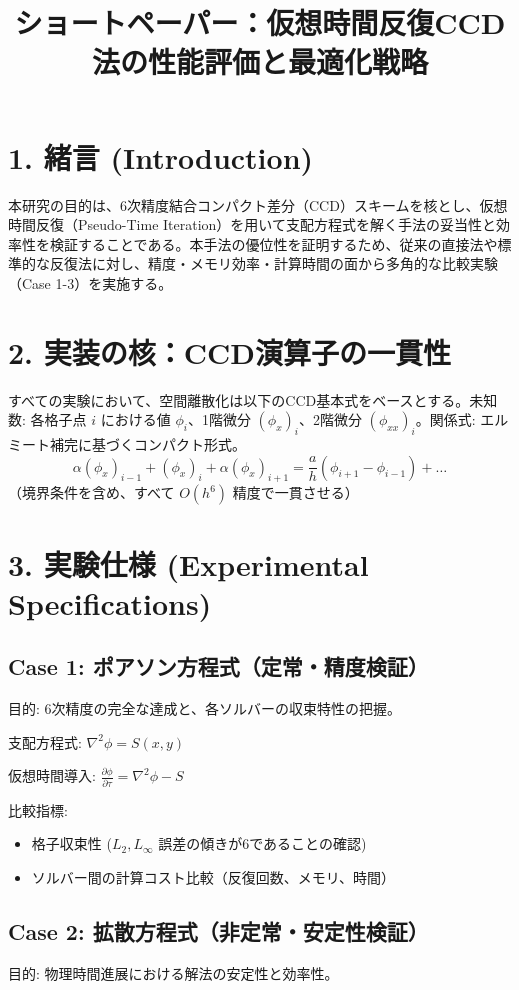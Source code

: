 \documentclass[12pt, a4paper, titlepage]{article}
\title{ショートペーパー：仮想時間反復CCD法の性能評価と最適化戦略}
\author{}
\date{}
\begin{document}
\maketitle

\section*{1. 緒言 (Introduction)}
本研究の目的は、6次精度結合コンパクト差分（CCD）スキームを核とし、仮想時間反復（Pseudo-Time Iteration）を用いて支配方程式を解く手法の妥当性と効率性を検証することである。本手法の優位性を証明するため、従来の直接法や標準的な反復法に対し、精度・メモリ効率・計算時間の面から多角的な比較実験（Case 1-3）を実施する。

\section*{2. 実装の核：CCD演算子の一貫性}
すべての実験において、空間離散化は以下のCCD基本式をベースとする。未知数: 各格子点 $i$ における値 $\phi_i$、1階微分 $(\phi_x)_i$、2階微分 $(\phi_{xx})_i$。関係式: エルミート補完に基づくコンパクト形式。
$$\alpha (\phi_x)_{i-1} + (\phi_x)_i + \alpha (\phi_x)_{i+1} = \frac{a}{h}(\phi_{i+1} - \phi_{i-1}) + \dots$$
（境界条件を含め、すべて $O(h^6)$ 精度で一貫させる）

\section*{3. 実験仕様 (Experimental Specifications)}

\subsection*{Case 1: ポアソン方程式（定常・精度検証）}
目的: 6次精度の完全な達成と、各ソルバーの収束特性の把握。

支配方程式: $\nabla^2 \phi = S(x, y)$

仮想時間導入: $\frac{\partial \phi}{\partial \tau} = \nabla^2 \phi - S$

比較指標:
\begin{itemize}
    \item 格子収束性 ($L_2, L_\infty$ 誤差の傾きが6であることの確認)
    \item ソルバー間の計算コスト比較（反復回数、メモリ、時間）
\end{itemize}

\subsection*{Case 2: 拡散方程式（非定常・安定性検証）}
目的: 物理時間進展における解法の安定性と効率性。
\end{document}
